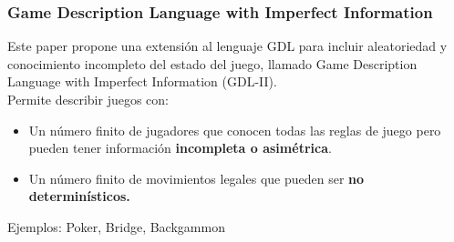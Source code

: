 \documentclass{beamer}
\begin{document}
\begin{frame}
\frametitle{Game Description Language with Imperfect Information}

Este paper propone una extensión al lenguaje GDL para incluir aleatoriedad y conocimiento incompleto del estado del juego, llamado Game Description Language with Imperfect Information (GDL-II). \\
Permite describir juegos con:

\begin{itemize}
\item {Un número finito de jugadores que conocen todas las reglas de juego pero pueden tener información {\bf incompleta o asimétrica}.}
\item {Un número finito de movimientos legales que pueden ser \bf{no determinísticos}.}
\end{itemize}

Ejemplos: Poker, Bridge, Backgammon 

\end{frame}
\end{document}
